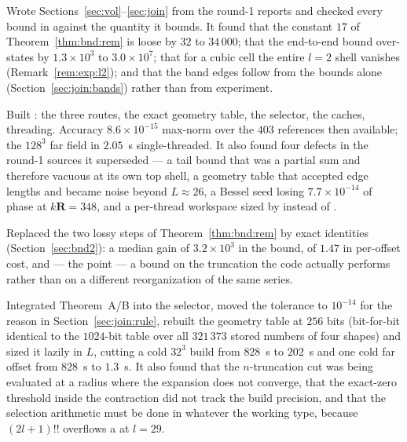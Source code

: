 \begin{description}[leftmargin=1.4em]
\item[The theory pass.] Wrote Sections~\ref{sec:vol}--\ref{sec:join} from the round-1
reports and checked every bound in  against the quantity it bounds. It found
that the constant $17$ of Theorem~\ref{thm:bnd:rem} is loose by $32$ to $34\,000$; that the
end-to-end bound over-states by $1.3\times10^{3}$ to $3.0\times10^{7}$; that for a cubic
cell the entire $l = 2$ shell vanishes (Remark~\ref{rem:exp:l2}); and that the band edges
follow from the bounds alone (Section~\ref{sec:join:bands}) rather than from experiment.

\item[The unification pass.] Built : the three routes, the exact geometry
table, the selector, the caches, threading. Accuracy $8.6\times10^{-15}$ max-norm over the
$403$ references then available; the $128^3$ far field in $2.05$~s single-threaded. It also
found four defects in the round-1 sources it superseded --- a tail bound that was a partial
sum and therefore vacuous at its own top shell, a geometry table that accepted
 edge lengths and became noise beyond $L \approx 26$, a Bessel seed losing
$7.7\times10^{-14}$ of phase at $k\mathbf{R} = 348$, and a per-thread workspace sized by
 instead of .

\item[The sharper bound.] Replaced the two lossy steps of Theorem~\ref{thm:bnd:rem} by exact
identities (Section~\ref{sec:bnd2}): a median gain of $3.2\times10^{3}$ in the bound, of
$1.47$ in per-offset cost, and --- the point --- a bound on the truncation the code actually
performs rather than on a different reorganization of the same series.

\item[The preparation pass.] Integrated Theorem~A/B into the selector, moved the tolerance
to $10^{-14}$ for the reason in Section~\ref{sec:join:rule}, rebuilt the geometry table at
$256$ bits (bit-for-bit identical to the $1024$-bit table over all $321\,373$ stored numbers
of four shapes) and sized it lazily in $L$, cutting a cold $32^3$ build from $828$~s to
$202$~s and one cold far offset from $828$~s to $1.3$~s. It also found that the
$n$-truncation cut was being evaluated at a radius where the expansion does not converge,
that the exact-zero threshold inside the contraction did not track the build precision, and
that the selection arithmetic must be done in  whatever the working type,
because $(2l+1)!!$ overflows a  at $l = 29$.


\end{description}
